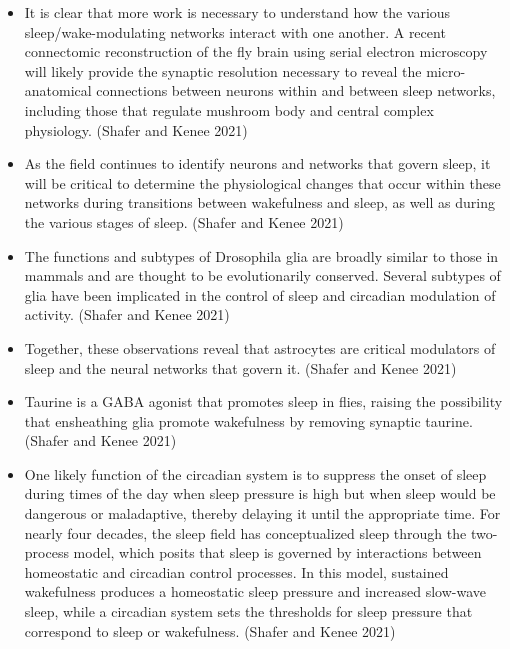 \documentclass[11pt]{article}
\begin{document}
\begin{itemize}
    \item It is clear that more work is necessary to understand how the various sleep/wake-modulating networks interact with one another. A recent connectomic reconstruction of the fly brain using serial electron microscopy will likely provide the synaptic resolution necessary to reveal the micro-anatomical connections between neurons within and between sleep networks, including those that regulate mushroom body and central complex physiology.
    \cite{shaferRegulationDrosophilaSleep2021} (Shafer and Kenee 2021)

    \item As the field continues to identify neurons and networks that govern sleep, it will be critical to determine the physiological changes that occur within these networks during transitions between wakefulness and sleep, as well as during the various stages of sleep.
    \cite{shaferRegulationDrosophilaSleep2021} (Shafer and Kenee 2021)

    \item The functions and subtypes of Drosophila glia are broadly similar to those in mammals and are thought to be evolutionarily conserved.
    Several subtypes of glia have been implicated in the control of sleep and circadian modulation of activity.
    \cite{shaferRegulationDrosophilaSleep2021} (Shafer and Kenee 2021)

    \item Together, these observations reveal that astrocytes are critical modulators of sleep and the neural networks that govern it.
    \cite{shaferRegulationDrosophilaSleep2021} (Shafer and Kenee 2021)

    \item Taurine is a GABA agonist that promotes sleep in flies, raising the possibility that ensheathing glia promote wakefulness by removing synaptic taurine.
    \cite{shaferRegulationDrosophilaSleep2021} (Shafer and Kenee 2021)

    \item One likely function of the circadian system is to suppress the onset of sleep during times of the day when sleep pressure is high but when sleep would be dangerous or maladaptive, thereby delaying it until the appropriate time.
    For nearly four decades, the sleep field has conceptualized sleep through the two-process model, which posits that sleep is governed by interactions between homeostatic and circadian control processes.
    In this model, sustained wakefulness produces a homeostatic sleep pressure and increased slow-wave sleep, while a circadian system sets the thresholds for sleep pressure that correspond to sleep or wakefulness.
    \cite{shaferRegulationDrosophilaSleep2021} (Shafer and Kenee 2021)


\end{itemize}
\end{document}
